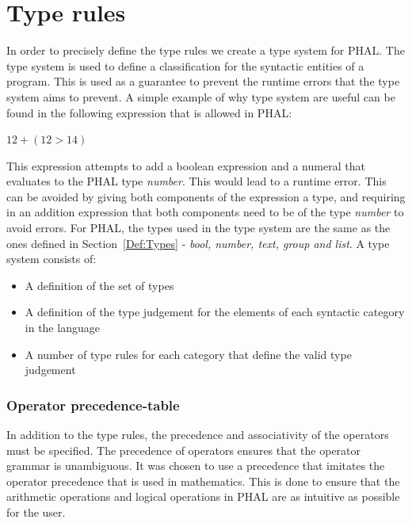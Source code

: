 \section{Type rules}\label{subsec:FormalTypeRules}
In order to precisely define the type rules we create a type system for PHAL. The type system is used to define a classification for the syntactic entities of a program. This is used as a guarantee to prevent the runtime errors that the type system aims to prevent.  A simple example of why type system are useful can be found in the following expression that is allowed in PHAL:
\begin{center}
$12 + (12 > 14)$
\end{center}
This expression attempts to add a boolean expression and a numeral that evaluates to the PHAL type \textit{number}. This would lead to a runtime error. This can be avoided by giving both components of the expression a type, and requiring in an addition expression that both components need to be of the type \textit{number} to avoid errors. For PHAL, the types used in the type system are the same as the ones defined in Section~\ref{Def:Types} - \textit{bool, number, text, group and list}. A type system consists of:
\begin{itemize}
    \item A definition of the set of types
    \item A definition of the type judgement for the elements of each syntactic category in the language
    \item A number of type rules for each category that define the valid type judgement\cite{PilenVedTraeetsRod}
\end{itemize}

\subsubsection{Operator precedence-table}
In addition to the type rules, the precedence and associativity of the operators must be specified. The precedence of operators ensures that the operator grammar is unambiguous. 
It was chosen to use a precedence that imitates the operator precedence that is used in mathematics. This is done to ensure that the arithmetic operations and logical operations in PHAL are as intuitive as possible for the user. 

